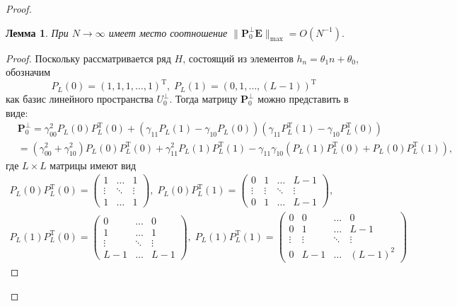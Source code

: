 \documentclass[specialist,
substylefile = spbu_report.rtx,
subf,href,colorlinks=true, 12pt]{disser}
\newtheorem{lemma}{Лемма}
\begin{document}
\begin{proof}
		
		\begin{lemma}
			При $N\rightarrow\infty$ имеет место соотношение $\|\mathbf{P}_0^{\bot}\mathbf{E}\|_{\max} = O(N^{-1}).$
		\end{lemma}
		\begin{proof}
			Поскольку рассматривается ряд $H$, состоящий из элементов $h_n = \theta_1n + \theta_0$, обозначим
			\begin{equation*}
				P_L(0)=(1,1,1,\dots,1)^\mathrm{T},\; P_L(1)=(0,1,\dots,(L-1))^\mathrm{T}
			\end{equation*}
			как базис линейного пространства $U_0^\bot$. Тогда матрицу $\mathbf{P}_0^\bot$ можно представить в виде:
			\begin{align}
				&\mathbf{P}_0^\bot=\gamma_{00}^2P_L(0)P_L^\mathrm{T}(0)+(\gamma_{11}P_L(1)-\gamma_{10}P_L(0))(\gamma_{11}P_L^\mathrm{T}(1)-\gamma_{10}P_L^\mathrm{T}(0))\nonumber
				\\
				&=(\gamma_{00}^2+\gamma_{10}^2)P_L(0)P_L^\mathrm{T}(0)+\gamma_{11}^2P_L(1)P_L^\mathrm{T}(1)-\gamma_{11}\gamma_{10}(P_L(1)P_L^\mathrm{T}(0)+P_L(0)P_L^\mathrm{T}(1)),\label{eq:l_3}
			\end{align}
			где $L\times L$ матрицы имеют вид
			\begin{align*}
				P_L(0)P_L^\mathrm{T}(0)=
				\begin{pmatrix}
					1 & \dots & 1\\
					\vdots & \ddots & \vdots\\
					1 & \dots & 1
				\end{pmatrix}
				,\; P_L(0)P_L^\mathrm{T}(1)=
				\begin{pmatrix}
					0&1&\dots&L-1\\
					\vdots&\vdots&\ddots&\vdots\\
					0&1&\dots&L-1
				\end{pmatrix}
				,\\
				P_L(1)P_L^\mathrm{T}(0)=
				\begin{pmatrix}
					0&\dots&0\\
					1&\dots&1\\
					\vdots&\ddots&\vdots\\
					L-1&\dots&L-1
				\end{pmatrix}
				,\; P_L(1)P_L^\mathrm{T}(1)=
				\begin{pmatrix}
					0&0&\dots&0\\
					0&1&\dots&L-1\\
					\vdots&\vdots&\ddots&\vdots\\
					0&L-1&\dots&(L-1)^2

\end{pmatrix}
\end{align*}
\end{proof}
\end{proof}
\end{document}
